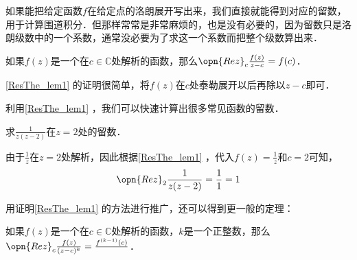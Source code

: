 如果能把给定函数$f$在给定点的洛朗展开写出来，我们直接就能得到对应的留数，用于计算围道积分．但那样常常是非常麻烦的，也是没有必要的，因为留数只是洛朗级数中的一个系数，通常没必要为了求这一个系数而把整个级数算出来．

\begin{lemma}{}\label{ResThe_lem1}
如果$f(z)$是一个在$c\in\mathbb{C}$处解析的函数，那么$\opn{Rez}_c\frac{f(z)}{z-c}=f(c)$．
\end{lemma}

\autoref{ResThe_lem1} 的证明很简单，将$f(z)$在$c$处泰勒展开以后再除以$z-c$即可．

利用\autoref{ResThe_lem1} ，我们可以快速计算出很多常见函数的留数．

\begin{example}{}
求$\frac{1}{z(z-2)}$在$z=2$处的留数．

由于$\frac{1}{z}$在$z=2$处解析，因此根据\autoref{ResThe_lem1} ，代入$f(z)=\frac{1}{z}$和$c=2$可知，
\begin{equation}
\opn{Rez}_2\frac{1}{z(z-2)}=\frac{1}{1}=1
\end{equation}
\end{example}

用证明\autoref{ResThe_lem1} 的方法进行推广，还可以得到更一般的定理：

\begin{theorem}{}
如果$f(z)$是一个在$c\in\mathbb{C}$处解析的函数，$k$是一个正整数，那么$\opn{Rez}_c\frac{f(z)}{(z-c)^k}=\frac{f^{(k-1)}(c)}{}$．
\end{theorem}







